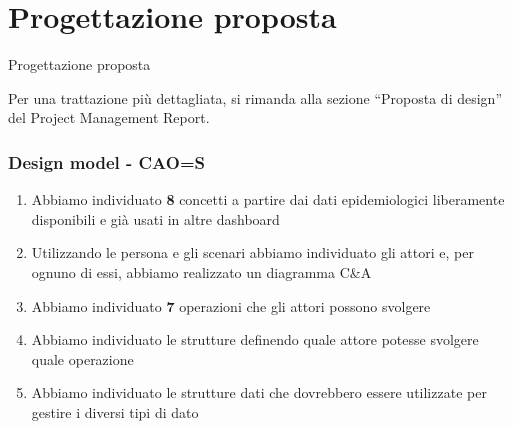 \documentclass[handout]{beamer}
\begin{document}
	\section{Progettazione proposta}
		\begin{frame}
			\centering
			\begin{Huge}
				Progettazione proposta
			\end{Huge}
			\mbox{}
			\vfill
			\vspace*{100px}
			\begin{tiny}
				Per una trattazione più dettagliata, si rimanda alla sezione ``Proposta di design'' del Project Management Report.
			\end{tiny}
		\end{frame}
		\begin{frame}
			\frametitle{Design model - CAO=S}
			\begin{enumerate}[<+->]
				\item Abbiamo individuato \textbf{8} concetti a partire dai dati epidemiologici liberamente disponibili e già usati in altre dashboard\\
				\item Utilizzando le persona e gli scenari abbiamo individuato gli attori e, per ognuno di essi, abbiamo realizzato un diagramma C\&A\\
				\item Abbiamo individuato \textbf{7} operazioni che gli attori possono svolgere\\
				\item Abbiamo individuato le strutture definendo quale attore potesse svolgere quale operazione\\
				\item Abbiamo individuato le strutture dati che dovrebbero essere utilizzate per gestire i diversi tipi di dato\\
			\end{enumerate}
		\end{frame}
\end{document}
